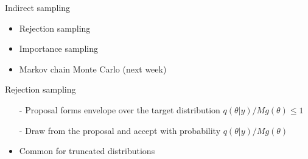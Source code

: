 \documentclass[finnish,english,t]{beamer}
\begin{document}
\begin{frame}{Indirect sampling}
  
  \begin{itemize}
  \item Rejection sampling
  \item Importance sampling
  \item Markov chain Monte Carlo (next week)
  \end{itemize}

\end{frame}

\begin{frame}{Rejection sampling}

    \vspace{-.3\baselineskip}
  \begin{itemize}
  \item[-] Proposal forms envelope over the target distribution ${q(\theta|y)}/{M g(\theta)} \leq 1$
  \item[-] Draw from the proposal and accept with probability ${q(\theta|y)}/{M g(\theta)}$
  \item<3>[-] Common for truncated distributions
  \end{itemize}
  \begin{center}
    \vspace{-1.6\baselineskip}
  \end{center}

\end{frame}
\end{document}
